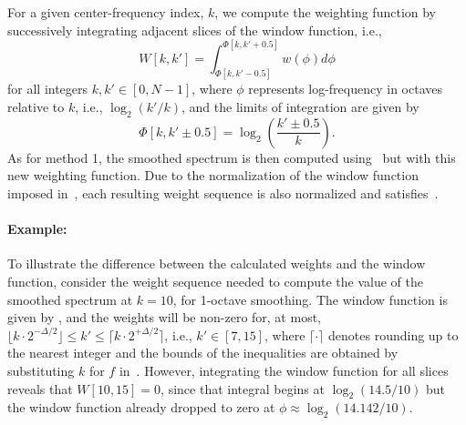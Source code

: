 For a given center-frequency index, $k$, we compute the weighting function by successively integrating adjacent slices of the window function, i.e.,
\begin{equation}\label{eq:A3_Smoothing_Weights:WeightsIntegral}
W[k, k'] = \int_{\Phi[k, k' - 0.5]}^{\Phi[k, k' + 0.5]} w(\phi) d\phi
\end{equation}
for all integers $k,k' \in [0, N - 1]$, where $\phi$ represents log-frequency in octaves relative to $k$, i.e., $\log_2(k'/k)$, and the limits of integration are given by
\begin{equation}\label{eq:A3_Smoothing_Weights:WeightsIntegralLimits}
\Phi[k, k' \pm 0.5] = \log_2 \left( \frac{k' \pm 0.5}{k} \right).
\end{equation}
As for method 1, the smoothed spectrum is then computed using~ but with this new weighting function.
Due to the normalization of the window function imposed in~, each resulting weight sequence is also normalized and satisfies~.

\paragraph*{Example:} To illustrate the difference between the calculated weights and the window function, consider the weight sequence needed to compute the value of the smoothed spectrum at $k = 10$, for 1-octave smoothing.
The window function is given by , and the weights will be non-zero for, at most, $\lfloor k \cdot 2^{-\Delta/2} \rfloor \leq k' \leq \lceil k \cdot 2^{+\Delta/2} \rceil$, i.e., $k' \in [7, 15]$, where $\lceil \cdot \rceil$ denotes rounding up to the nearest integer and the bounds of the inequalities are obtained by substituting $k$ for $f$ in~.
However, integrating the window function for all slices reveals that $W[10,15] = 0$, since that integral begins at $\log_2 (14.5/10)$ but the window function already dropped to zero at $\phi \approx \log_2 (14.142/10)$.

